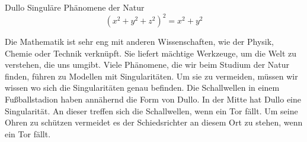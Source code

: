 \begin{surferPage}{Dullo}
Singuläre Phänomene der Natur\\
\smallskip
\[(x^2+ y^2+ z^2)^2	= x^2+ y^2\]

\singlespacing
Die Mathematik ist sehr eng mit anderen Wissenschaften, wie der Physik, Chemie oder Technik verknüpft. Sie liefert mächtige Werkzeuge, um die Welt zu verstehen, die uns umgibt.
\singlespacing
Viele Phänomene, die wir beim Studium der Natur finden, führen zu Modellen mit Singularitäten. Um sie zu vermeiden, müssen wir wissen wo sich die Singularitäten genau befinden. 
\singlespacing
Die Schallwellen in einem Fußballstadion haben annähernd die Form von Dullo. In der Mitte hat Dullo eine Singularität. An dieser treffen sich die Schallwellen, wenn ein Tor fällt. Um seine Ohren zu schützen vermeidet es der Schiedsrichter an diesem Ort zu stehen, wenn ein Tor fällt.
\end{surferPage}

